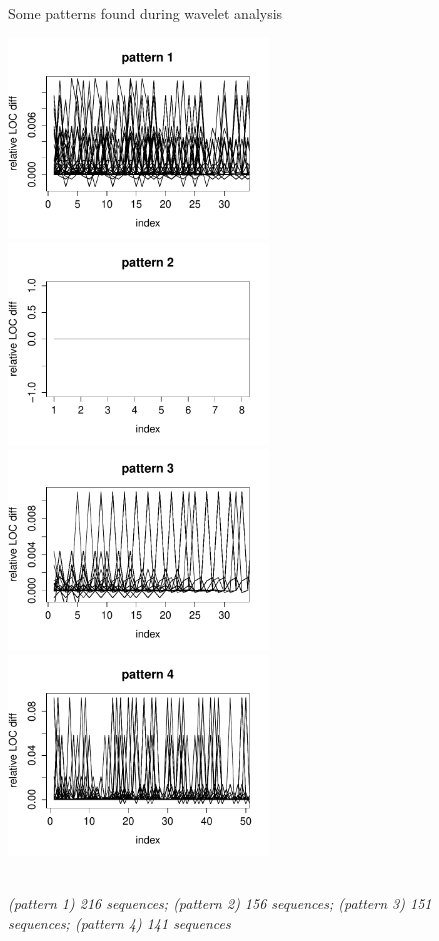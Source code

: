 \begin{figure}[H]
\caption{Some patterns found during wavelet
analysis}\label{figure:patterns_plots}
\caption*{\\[1em]\footnotesize\emph{(pattern 1) 216 sequences; (pattern 2) 156
sequences; (pattern 3) 151 sequences; (pattern 4) 141 sequences}\\[1em]}
\centering
	\includegraphics[width=196pt]{images/pattern_1.pdf}
	\hspace{1em}
	\includegraphics[width=196pt]{images/pattern_2.pdf}
	\\
	\vspace{1em}
	\includegraphics[width=196pt]{images/pattern_3.pdf}
	\hspace{1em}
	\includegraphics[width=196pt]{images/pattern_4.pdf}
\end{figure}